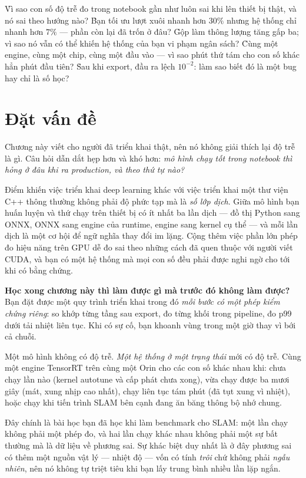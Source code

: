 \documentclass[../../deep_learning.tex]{subfiles}
\begin{document}
\begin{khoigoi}
\h{Vì sao con số độ trễ đo trong notebook gần như luôn sai khi lên thiết bị thật, và nó sai theo hướng nào?}
\h{Bạn tối ưu lượt xuôi nhanh hơn $30\%$ nhưng hệ thống chỉ nhanh hơn $7\%$ --- phần còn lại đã trốn ở đâu?}
\h{Gộp  làm thông lượng tăng gấp ba; vì sao nó vẫn có thể khiến hệ thống của bạn vi phạm ngân sách?}
\h{Cùng một engine, cùng một chip, cùng một đầu vào --- vì sao phút thứ tám cho con số khác hẳn phút đầu tiên?}
\h{Sau khi export, đầu ra lệch $10^{-2}$: làm sao biết đó là một bug hay chỉ là số học?}
\end{khoigoi}

\section{Đặt vấn đề}
Chương này viết cho người đã triển khai thật, nên nó không giải thích lại độ trễ là gì. Câu hỏi dẫn dắt hẹp hơn và khó hơn: \emph{mô hình chạy tốt trong notebook thì hỏng ở đâu khi ra production, và theo thứ tự nào?}

Điểm khiến việc triển khai deep learning khác với việc triển khai một thư viện C++ thông thường không phải độ phức tạp mà là \emph{số lớp dịch}. Giữa mô hình bạn huấn luyện và thứ chạy trên thiết bị có ít nhất ba lần dịch --- đồ thị Python sang ONNX, ONNX sang engine của runtime, engine sang kernel cụ thể --- và mỗi lần dịch là một cơ hội để ngữ nghĩa thay đổi im lặng. Cộng thêm việc phần lớn phép đo hiệu năng trên GPU dễ đo sai theo những cách đã quen thuộc với người viết CUDA, và bạn có một hệ thống mà mọi con số đều phải được nghi ngờ cho tới khi có bằng chứng.

\textbf{Học xong chương này thì làm được gì mà trước đó không làm được?} Bạn đặt được một quy trình triển khai trong đó \emph{mỗi bước có một phép kiểm chứng riêng}: so khớp từng tầng sau export, đo từng khối trong pipeline, đo p99 dưới tải nhiệt liên tục. Khi có sự cố, bạn khoanh vùng trong một giờ thay vì bới cả chuỗi.

\begin{trucgiac}
Một mô hình không có độ trễ. \emph{Một hệ thống ở một trạng thái} mới có độ trễ. Cùng một engine TensorRT trên cùng một Orin cho các con số khác nhau khi: chưa chạy lần nào (kernel autotune và cấp phát chưa xong), vừa chạy được ba mươi giây (mát, xung nhịp cao nhất), chạy liên tục tám phút (đã tụt xung vì nhiệt), hoặc chạy khi tiến trình SLAM bên cạnh đang ăn băng thông bộ nhớ chung.

Đây chính là bài học bạn đã học khi làm benchmark cho SLAM: một lần chạy không phải một phép đo, và hai lần chạy khác nhau không phải một sự bất thường mà là dữ liệu về phương sai. Sự khác biệt duy nhất là ở đây phương sai có thêm một nguồn vật lý --- nhiệt độ --- vốn có tính \emph{trôi} chứ không phải \emph{ngẫu nhiên}, nên nó không tự triệt tiêu khi bạn lấy trung bình nhiều lần lặp ngắn.
\end{trucgiac}
\end{document}
